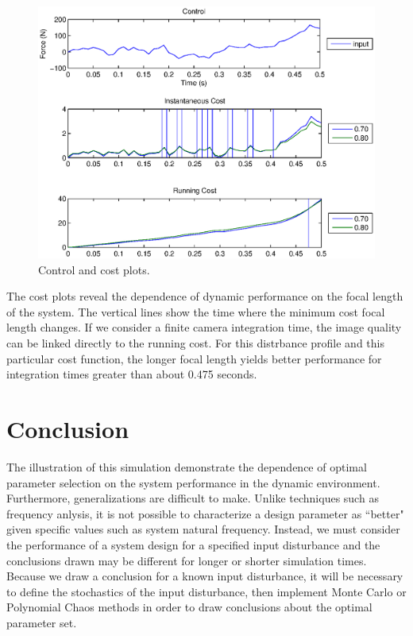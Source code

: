 \documentclass{aiaa-tc}
\begin{document}
\begin{figure}[htb]	%
 \centering
 \includegraphics[width=1.0\textwidth]{Figures/costPlots}
 \caption{Control and cost plots.}
 \label{costPlots}
\end{figure}
The cost plots reveal the dependence of dynamic performance on the focal length of the system. The vertical lines show the time where the minimum cost focal length changes. If we consider a finite camera integration time, the image quality can be linked directly to the running cost. For this distrbance profile and this particular cost function, the longer focal length yields better performance for integration times greater than about 0.475 seconds.
\bigskip

\section{Conclusion}

The illustration of this simulation demonstrate the dependence of optimal parameter selection on the system performance in the dynamic environment. Furthermore, generalizations are difficult to make. Unlike techniques such as frequency anlysis, it is not possible to characterize a design parameter as ``better" given specific values such as system natural frequency. Instead, we must consider the performance of a system design for a specified input disturbance and the conclusions drawn may be different for longer or shorter simulation times. Because we draw a conclusion for a known input disturbance, it will be necessary to define the stochastics of the input disturbance, then implement Monte Carlo or Polynomial Chaos methods in order to draw conclusions about the optimal parameter set.
\end{document}
